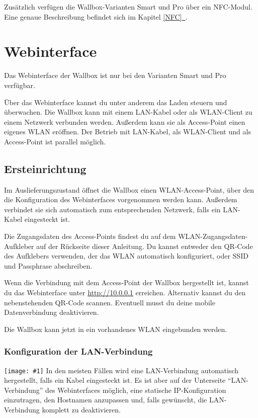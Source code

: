 \documentclass[a4paper,10pt]{article}
\newcommand{\gfx}[1]{\texttt{[image: \#1]}}
\newcommand*{\fullref}[1]{\hyperref[{#1}]{\ref*{#1}~\nameref*{#1}}}
\begin{document}
\begin{multicols*}{2}
	Zusätzlich verfügen die Wallbox-Varianten Smart und Pro über ein NFC-Modul. Eine
	genaue Beschreibung befindet sich im Kapitel \fullref{NFC}.

	\newpage
	\section{Webinterface}
	Das Webinterface der Wallbox ist nur bei den Varianten Smart und Pro verfügbar.

	Über das Webinterface kannst du unter anderem das Laden steuern und überwachen.
	Die Wallbox kann mit einem LAN-Kabel oder als WLAN-Client zu einem Netzwerk verbunden werden.
	Außerdem kann sie als Access-Point einen eigenes WLAN eröffnen.
	Der Betrieb mit LAN-Kabel, als WLAN-Client und als Access-Point ist parallel möglich.

	\subsection{Ersteinrichtung}\label{setup}
	Im Auslieferungszustand öffnet die Wallbox einen WLAN-Access-Point, über den
	die Konfiguration des Webinterfaces vorgenommen werden kann. Außerdem verbindet sie sich automatisch
	zum entsprechenden Netzwerk, falls ein LAN-Kabel eingesteckt ist.

	Die Zugangsdaten des Access-Points findest du auf dem WLAN-Zugangsdaten-Aufkleber
	auf der Rückseite dieser Anleitung. Du kannst entweder den QR-Code des Aufklebers verwenden,
	der das WLAN automatisch konfiguriert, oder SSID und Passphrase abschreiben.

	\begin{minipage}{0.35\textwidth}
		Wenn die Verbindung mit dem Access-Point der Wallbox hergestellt ist, kannst du das Webinterface
		unter \url{http://10.0.0.1} erreichen. Alternativ kannst du den nebenstehenden QR-Code scannen.
		Eventuell musst du deine mobile Datenverbindung deaktivieren.
	\end{minipage}\hfill
	\begin{minipage}{0.12\textwidth}
		\begin{flushright}
		\end{flushright}
	\end{minipage}

	Die Wallbox kann jetzt in ein vorhandenes WLAN eingebunden werden.


	\subsubsection{Konfiguration der LAN-Verbindung}
	\gfx{./img_warp2/resized/web_ethernet}
	In den meisten Fällen wird eine LAN-Verbindung automatisch hergestellt, falls ein Kabel eingesteckt ist.
	Es ist aber auf der Unterseite \enquote{LAN-Verbindung} des Webinterfaces möglich, eine statische IP-Konfiguration
	einzutragen, den Hostnamen anzupassen und, falls gewünscht, die LAN-Verbindung komplett zu deaktivieren.


\end{multicols*}
\end{document}
